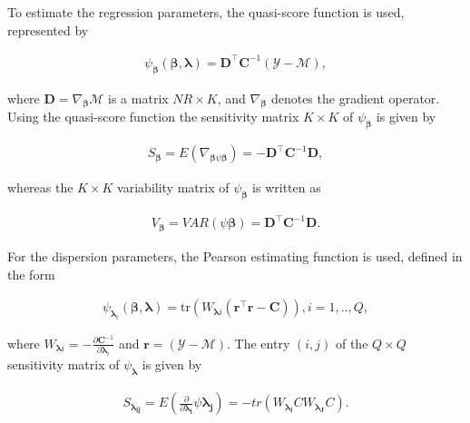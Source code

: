 \documentclass[article]{jss}\usepackage[]{graphicx}\usepackage[]{xcolor}
\begin{document}
To estimate the regression parameters, the quasi-score function \citep{Liang86} is used, represented by

$$
\begin{aligned}
  \psi_{\boldsymbol{\beta}}(\boldsymbol{\beta},
  \boldsymbol{\lambda}) = \boldsymbol{D}^\top
  \boldsymbol{C}^{-1}(\mathcal{Y} - \mathcal{M}),
\end{aligned}
$$

\noindent where $\boldsymbol{D} = \nabla_{\boldsymbol{\beta}} \mathcal{M}$ is a matrix $NR \times K$, and $\nabla_{\boldsymbol{\beta}}$ denotes the gradient operator. Using the quasi-score function the sensitivity matrix $K \times K$ of $\psi_{\boldsymbol{\beta}}$ is given by

$$
\begin{aligned}
S_{\boldsymbol{\beta}} = E(\nabla_{\boldsymbol{\beta} \psi \boldsymbol{\beta}}) = -\boldsymbol{D}^{\top} \boldsymbol{C}^{-1} \boldsymbol{D},
\end{aligned}
$$

\noindent whereas the $K \times K$ variability matrix of $\psi_{\boldsymbol{\beta}}$ is written as

$$
\begin{aligned}
V_{\boldsymbol{\beta}} = VAR(\psi \boldsymbol{\beta}) = \boldsymbol{D}^{\top} \boldsymbol{C}^{-1} \boldsymbol{D}.
\end{aligned}
$$

For the dispersion parameters, the Pearson estimating function is used, defined in the form

$$
  \begin{aligned}
    \psi_{\boldsymbol{\lambda}_i}(\boldsymbol{\beta},
    \boldsymbol{\lambda}) =
    \mathrm{tr}(W_{\boldsymbol{\lambda}i}
    (\boldsymbol{r}^\top\boldsymbol{r} -
    \boldsymbol{C})),  i = 1,.., Q, 
  \end{aligned}
$$

\noindent where $W_{\boldsymbol{\lambda}i} = -\frac{\partial \boldsymbol{C}^{-1}}{\partial \boldsymbol{\lambda}_i}$ and $\boldsymbol{r} = (\mathcal{Y} - \mathcal{M})$. The entry $(i,j)$ of the $Q \times Q$ sensitivity matrix of $\psi_{\boldsymbol{\lambda}}$ is given by

$$
  \begin{aligned}
    S_{\boldsymbol{\lambda_{ij}}} = E \left (\frac{\partial }{\partial \boldsymbol{\lambda_{i}}} \psi \boldsymbol{\lambda_{j}}\right) = -tr(W_{\boldsymbol{\lambda_{i}}} CW_{\boldsymbol{\lambda_{J}}} C).
  \end{aligned}
$$
\end{document}
